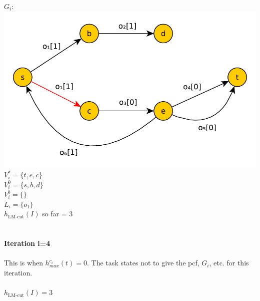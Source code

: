 \documentclass[11pt,a4paper]{article}
\begin{document}
\\
$G_i:$\\
\includegraphics[scale=0.5]{jugraph3}\\
$V^*_i=\{t,e,c\}$\\
$V^0_i=\{s,b,d\}$\\
$V^b_i=\{\}$\\
$L_i=\{o_1\}$\\
$h_{\text{LM-cut}}(I)$ so far = 3\\
\\
\\
\textbf{Iteration i=4}\\
\\
This is when $h^{c_i}_{max}(t)=0$. The task states not to give the pcf, $G_i$, etc. for this iteration.\\
\\
$h_{\text{LM-cut}}(I)=3$
\end{document}

